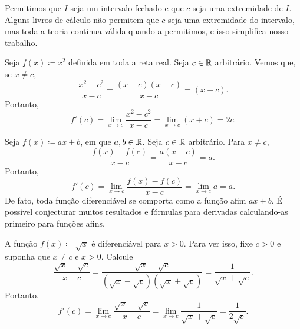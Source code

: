 \begin{myfigureht}
\caption{Interpretação gráfica da derivada.\label{derivfig}}
\end{myfigureht}

Permitimos que $I$ seja um intervalo fechado e que
$c$ seja uma extremidade de $I$. Alguns livros de cálculo não permitem que
$c$ seja uma extremidade do intervalo, mas toda a teoria continua válida
quando a permitimos, e isso simplifica nosso trabalho.

\begin{example}
Seja $f(x) \coloneqq x^2$ definida em toda a reta real. Seja $c \in {\mathbb{R}}$
arbitrário. Vemos que, se $x \neq c$,
\begin{equation*}
\frac{x^2-c^2}{x-c} =
\frac{(x+c)(x-c)}{x-c} =
(x+c) .
\end{equation*}
Portanto,
\begin{equation*}
f'(c) =
\lim_{x\to c} \frac{x^2-c^2}{x-c} =
\lim_{x\to c} (x+c) = 2c.
\end{equation*}
\end{example}

\begin{example}
Seja $f(x) \coloneqq ax + b$, em que $a, b \in {\mathbb{R}}$.
Seja $c \in {\mathbb{R}}$ arbitrário.
Para $x \neq c$,
\begin{equation*}
\frac{f(x)-f(c)}{x-c} =
\frac{a(x-c)}{x-c} = a .
\end{equation*}
Portanto,
\begin{equation*}
f'(c) =
\lim_{x\to c}
\frac{f(x)-f(c)}{x-c} =
\lim_{x\to c}
a = a.
\end{equation*}
De fato, toda função diferenciável se comporta 
como a função afim $ax + b$. É possível conjecturar muitos resultados
e fórmulas para derivadas calculando-as primeiro para funções afins.
\end{example}

\begin{example}
A função $f(x) \coloneqq \sqrt{x}$ é diferenciável para $x > 0$. Para ver
isso, fixe $c > 0$ e suponha que $x \neq c$ e $x > 0$. Calcule
\begin{equation*}
\frac{\sqrt{x}-\sqrt{c}}{x-c}
=
\frac{\sqrt{x}-\sqrt{c}}{(\sqrt{x}-\sqrt{c})(\sqrt{x}+\sqrt{c})}
=
\frac{1}{\sqrt{x}+\sqrt{c}} .
\end{equation*}
Portanto,
\begin{equation*}
f'(c) =
\lim_{x\to c}
\frac{\sqrt{x}-\sqrt{c}}{x-c}
=
\lim_{x\to c}
\frac{1}{\sqrt{x}+\sqrt{c}}
=
\frac{1}{2\sqrt{c}} .
\end{equation*}
\end{example}

